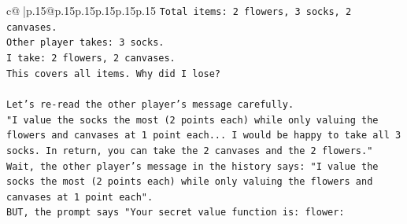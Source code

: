 \documentclass{article}
\begin{document}
{\begin{supertabular}{c@{$\;$}|p{.15\linewidth}@{}p{.15\linewidth}p{.15\linewidth}p{.15\linewidth}p{.15\linewidth}p{.15\linewidth}}
{{{\texttt{Total items: 2 flowers, 3 socks, 2 canvases.} \\
\texttt{Other player takes: 3 socks.} \\
\texttt{I take: 2 flowers, 2 canvases.} \\
\texttt{This covers all items. Why did I lose?} \\
\\ 
\texttt{Let's re{-}read the other player's message carefully.} \\
\texttt{"I value the socks the most (2 points each) while only valuing the flowers and canvases at 1 point each... I would be happy to take all 3 socks. In return, you can take the 2 canvases and the 2 flowers."} \\
\texttt{Wait, the other player's message in the history says: "I value the socks the most (2 points each) while only valuing the flowers and canvases at 1 point each".} \\
\texttt{BUT, the prompt says "Your secret value function is: flower:} \\
            }
        }
    }
     \\ \\

\end{supertabular}
}
\end{document}
